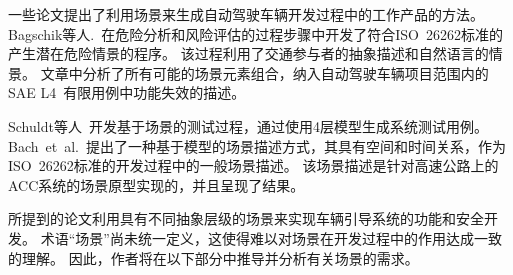 一些论文提出了利用场景来生成自动驾驶车辆开发过程中的工作产品的方法。
Bagschik等人.~\cite{bagschik_identification_2016}在危险分析和风险评估的过程步骤中开发了符合ISO~26262标准的产生潜在危险情景的程序。
该过程利用了交通参与者的抽象描述和自然语言的情景。
文章中分析了所有可能的场景元素组合，纳入自动驾驶车辆项目范围内的SAE L4~\cite{SAE2016}有限用例中功能失效的描述。

Schuldt等人~\cite {schuldt2011}开发基于场景的测试过程，通过使用4层模型生成系统测试用例。
Bach~et~al.~\cite{bach_model_2016}提出了一种基于模型的场景描述方式，其具有空间和时间关系，作为ISO~26262标准的开发过程中的一般场景描述。
该场景描述是针对高速公路上的ACC系统的场景原型实现的，并且呈现了结果。

所提到的论文利用具有不同抽象层级的场景来实现车辆引导系统的功能和安全开发。
术语“场景”尚未统一定义，这使得难以对场景在开发过程中的作用达成一致的理解。
因此，作者将在以下部分中推导并分析有关场景的需求。